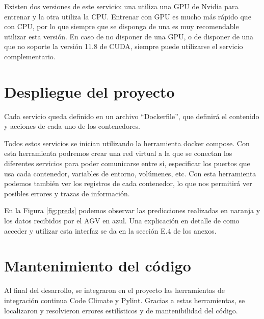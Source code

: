 Existen dos versiones de este servicio: una utiliza una GPU de Nvidia para entrenar y la otra utiliza la CPU. Entrenar con
GPU es mucho más rápido que con CPU, por lo que siempre que se disponga de una es muy recomendable utilizar esta versión.
En caso de no disponer de una GPU, o de disponer de una que no soporte la versión 11.8 de CUDA, siempre puede utilizarse el 
servicio complementario.


\section{Despliegue del proyecto}

Cada servicio queda definido en un archivo ``Dockerfile'', que definirá el contenido y acciones de cada uno de los 
contenedores.

Todos estos servicios se inician utilizando la herramienta docker compose. Con esta herramienta podremos crear
una red virtual a la que se conectan los diferentes servicios para poder comunicarse entre sí, especificar los
puertos que usa cada contenedor, variables de entorno, volúmenes, etc. Con esta herramienta podemos también ver los registros de cada contenedor, lo que nos permitirá ver posibles errores 
y trazas de información.


En la Figura \ref{fig:preds} podemos observar las predicciones realizadas en naranja y los datos 
recibidos por el AGV en azul. Una explicación en detalle de como acceder y utilizar esta interfaz se da 
en la sección E.4 de los anexos.

\section{Mantenimiento del código}

Al final del desarrollo, se integraron en el proyecto las herramientas de integración continua Code Climate y 
Pylint. Gracias a estas herramientas, se localizaron y resolvieron errores estilísticos y de mantenibilidad del código.